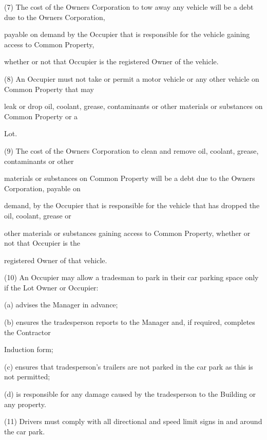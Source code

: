 \documentclass{article}
\begin{document}
{\fontsize{9.962}{1}(7) The cost of the Owners Corporation to tow away any vehicle will be a debt due to the Owners Corporation, }

{\fontsize{10.02}{1}payable on demand by the Occupier that is responsible for the vehicle gaining access to Common Property, }

{\fontsize{10.02}{1}whether or not that Occupier is the registered Owner of the vehicle. }

{\fontsize{9.962}{1}(8) An Occupier must not take or permit a motor vehicle or any other vehicle on Common Property that may }

{\fontsize{10.02}{1}leak or drop oil, coolant, grease, contaminants or other materials or substances on Common Property or a }

{\fontsize{10.02}{1}Lot. }

{\fontsize{9.962}{1}(9) The cost of the Owners Corporation to clean and remove oil, coolant, grease, contaminants or other }

{\fontsize{10.02}{1}materials or substances on Common Property will be a debt due to the Owners Corporation, payable on }

{\fontsize{10.02}{1}demand, by the Occupier that is responsible for the vehicle that has dropped the oil, coolant, grease or }

{\fontsize{10.02}{1}other materials or substances gaining access to Common Property, whether or not that Occupier is the }

{\fontsize{10.02}{1}registered Owner of that vehicle. }

{\fontsize{9.962}{1}(10) An Occupier may allow a tradesman to park in their car parking space only if the Lot Owner or Occupier: }

{\fontsize{9.962}{1}(a) advises the Manager in advance; }

{\fontsize{9.962}{1}(b) ensures the tradesperson reports to the Manager and, if required, completes the Contractor }

{\fontsize{10.02}{1}Induction form; }

{\fontsize{9.962}{1}(c) ensures that tradesperson’s trailers are not parked in the car park as this is not permitted; }

{\fontsize{9.962}{1}(d) is responsible for any damage caused by the tradesperson to the Building or any property. }

{\fontsize{9.962}{1}(11) Drivers must comply with all directional and speed limit signs in and around the car park. }
\end{document}
